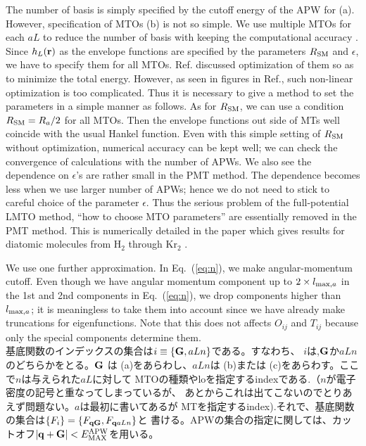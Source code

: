 \documentclass[a4paper,10pt,aip,onecolumn,amsmath,amssymb,floatfix,rmp]{revtex4-1}
\newcommand{\bfq}{{\bf q}}
\newcommand{\bfr}{{\bf r}}
\newcommand{\bfG}{{\bf G}}
\newcommand{\req}[1]{\mbox{Eq.~\!(\ref{#1})}}
\def\EMAX{  E^{\rm APW}_{\rm MAX} }
\def\RSM{R_{\rm SM}}
\def\EMAX{  E^{\rm APW}_{\rm MAX} }
\begin{document}
The number of basis is simply specified by the cutoff energy of the APW
for (a). However, specification of MTOs (b) is not so simple.  
We use multiple MTOs for each $aL$ to reduce the number of basis with 
keeping the computational accuracy \cite{pmt1}.
Since $h_L(\bfr)$ as the envelope functions are specified 
by the parameters $\RSM$ and $\epsilon$, we have to specify them for
all MTOs. Ref. discussed optimization of them so as
to minimize the total energy. However, as seen in figures in
Ref., such non-linear optimization is too complicated.
Thus it is necessary to give a method to set the parameters 
in a simple manner as follows. 
As for $\RSM$, we can use a condition $\RSM= R_a/2$ for all MTOs. 
Then the envelope functions out side of MTs well coincide with
the usual Hankel function. 
Even with this simple setting of $\RSM$ without optimization,
numerical accuracy can be kept well; we can check the
convergence of calculations with the number of APWs.
We also see the dependence on $\epsilon$'s are rather small
in the PMT method. The dependence becomes less when we use larger
number of APWs; hence we do not need to stick to careful choice of
the parameter $\epsilon$.
Thus the serious problem of the full-potential LMTO method, ``how
to choose MTO parameters'' are essentially removed in the PMT
method. This is numerically detailed in the paper which gives results for
diatomic molecules from H$_2$ through Kr$_2$ \cite{kotanimol2011}.

We use one further approximation. In \req{eq:n}, we make angular-momentum cutoff.
Even though we have angular momentum component up to 
$2\times l_{{\rm max},a}$ in the 1st and 2nd components in \req{eq:n}, 
we drop components higher than $l_{{\rm max},a}$; 
it is meaningless to take them into account since we have already make 
truncations for eigenfunctions. Note that this does not affects $O_{ij}$
and $T_{ij}$ because only the special components determine them.\\

基底関数のインデックスの集合は$i\equiv\{\bfG,aLn\}$である。すなわち、
$i$は,$\bfG$か$aLn$のどちらかをとる。$\bfG$ は (a)をあらわし、$aLn$は (b)または
(c)をあらわす。ここで$n$は与えられた$aL$に対して
MTOの種類やloを指定するindexである.（$n$が電子密度の記号と重なってしまっているが、
あとからこれは出てこないのでとりあえず問題ない。$a$は最初に書いてあるが
MTを指定するindex).それで、基底関数の集合は$\{F_i\}=\{F_{\bfq \bfG},F_{\bfq aLn}\}$と
書ける。APWの集合の指定に関しては、カットオフ$|\bfq+\bfG|<\EMAX$を用いる。
\end{document}
